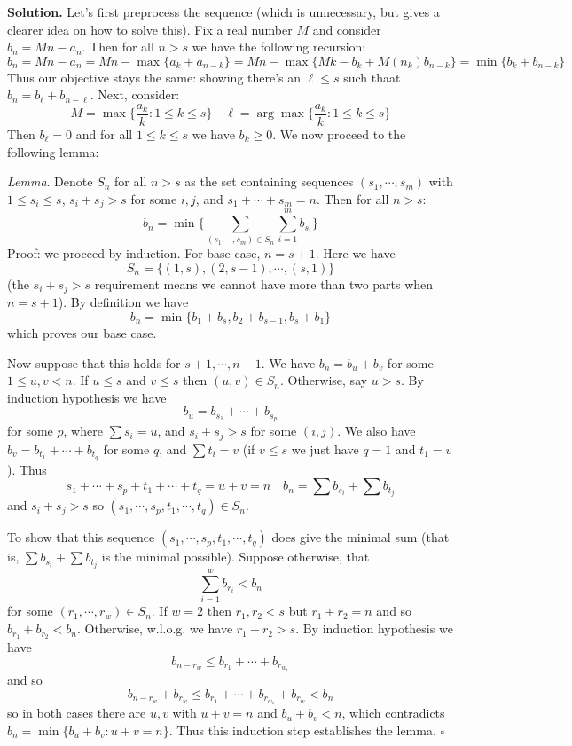 \documentclass[11pt]{article}
\newcommand{\<}{\langle}
\renewcommand{\>}{\rangle}
\begin{document}
\begin{enumerate}
	\textbf{Solution.} 
	Let's first preprocess the sequence (which is unnecessary, but gives a clearer idea on how to solve this). 
	Fix a real number $M$ and consider $b_n=Mn-a_n$. Then for all $n>s$ we have the following recursion: 
	\[
	b_n = Mn - a_n = Mn - \max \{a_k + a_{n-k}\}
	= Mn - \max \{Mk  - b_k + M(n_k) b_{n-k}\}
	= \min \{b_k + b_{n-k}\}
	\]
	Thus our objective stays the same: showing there's an $\ell\le s$ such thaat $b_n=b_{\ell}+b_{n-\ell}$. 
	Next, consider: 
	\[
	M = \max \{\frac{a_k}{k}: 1\le k\le s\}
	\quad 
	\ell = \arg\max \{\frac{a_k}{k}: 1\le k\le s\}
	\]
	Then $b_{\ell}=0$ and for all $1\le k\le s$ we have $b_{k}\ge 0$. 
	We now proceed to the following lemma: 
	
	\emph{Lemma}. Denote $S_n$ for all $n>s$ as the set containing sequences $(s_1, \cdots, s_{m})$ with $1\le s_i\le s$, $s_i+s_j>s$ for some $i, j$, and $s_1+\cdots + s_m = n$. Then for all $n>s$: 
	\[
	b_n = \min\{\sum_{(s_1, \cdots, s_{m})\in S_n}\sum_{i=1}^m b_{s_i}\}
	\]
	Proof: we proceed by induction. For base case, $n=s+1$. Here we have 
	\[
	S_n = \{(1, s), (2, s-1), \cdots, (s, 1)\}
	\]
	(the $s_i+s_j>s$ requirement means we cannot have more than two parts when $n=s+1$). 
	By definition we have 
	\[
	b_n = \min \{b_1+b_s, b_2 + b_{s-1}, b_s+b_1\}
	\]
	which proves our base case. 
	
	Now suppose that this holds for $s+1, \cdots, n-1$. 
	We have $b_n = b_u + b_{v}$ for some $1\le u, v<n$. 
	If $u\le s$ and $v\le s$ then $(u, v)\in S_n$. 
	Otherwise, say $u>s$. 
	By induction hypothesis we have 
	\[
	b_u = b_{s_1}+\cdots + b_{s_p}
	\]
	for some $p$, where $\sum s_i = u$, and $s_i+s_j>s$ for some $(i, j)$. 
	We also have $b_v = b_{t_1}+\cdots + b_{t_q}$ for some $q$, 
	and $\sum t_i=v$ (if $v\le s$ we just have $q=1$ and $t_1=v$). 
	Thus 
	\[
	s_1+\cdots + s_p + t_1+\cdots + t_q = u + v = n
	\quad 
	b_n = \sum b_{s_i} + \sum b_{t_j}
	\]
	and $s_i+s_j>s$ so $(s_1, \cdots, s_p, t_1, \cdots, t_q)\in S_n$. 
	
	To show that this sequence $(s_1, \cdots, s_p, t_1, \cdots, t_q)$ does give the minimal sum 
	(that is, $\sum b_{s_i} + \sum b_{t_j}$ is the minimal possible). 
	Suppose otherwise, that 
	\[
	\sum_{i=1}^w b_{r_i} < b_n
	\]
	for some $(r_1, \cdots, r_w)\in S_n$. 
	If $w=2$ then $r_1, r_2<s$ but $r_1+r_2=n$ and so $b_{r_1}+b_{r_2}<b_n$. 
	Otherwise, w.l.o.g. we have $r_1+r_2>s$. 
	By induction hypothesis we have 
	\[
	b_{n-r_w}\le b_{r_1}+\cdots + b_{r_{w_1}}
	\]
	and so 
	\[
	b_{n-r_w}+b_{r_w}
	\le b_{r_1}+\cdots + b_{r_{w_1}} + b_{r_w}
	< b_n
	\]
	so in both cases there are $u, v$ with $u+v=n$ and $b_u+b_v<n$, which contradicts 
	$b_n = \min \{b_u+b_v: u+v=n\}$. 
	Thus this induction step establishes the lemma. $\square$
	

\end{enumerate}
\end{document}
